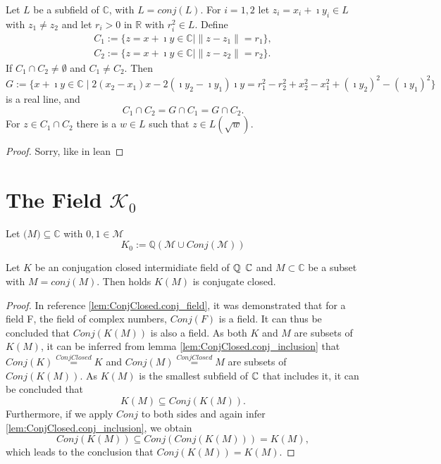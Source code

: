 \begin{lemma}
    \label{Intersection_circle_circle}
    Let $L$ be a subfield of $\mathbb{C}$, with $L = conj(L)$. For $i = 1,2 $ let $z_i = x_i + \imath y_i \in L$ with $z_1 \ne z_2$ and let $r_i > 0$ in $\mathbb{R}$ with $r_i^2 \in L$. Define
    \begin{equation*} \begin{aligned}
        C_1 := \{z = x + \imath y \in \mathbb{C} \mid \|z - z_1\| = r_1\},\\
        C_2 := \{z = x + \imath y \in \mathbb{C} \mid \|z - z_2\| = r_2\}.
    \end{aligned} \end{equation*}
    If $C_1 \cap C_2 \ne \emptyset$ and $C_1 \ne C_2$. Then 
    $$G := \{x+\imath y \in \mathbb{C} \mid 2(x_2 - x_1)x - 2(\imath y_2 - \imath y_1)\imath y = r_1^2 - r_2^2 + x_2^2 - x_1^2 + (\imath y_2)^2 - (\imath y_1)^2\} $$
    is a real line, and $$ C_1 \cap C_2 = G \cap C_1 = G \cap C_2. $$
    For $z \in C_1 \cap C_2$ there is a $w \in L$ such that $z \in L(\sqrt{w})$.
\end{lemma}
\begin{proof}
    Sorry,  like in lean %
\end{proof}

\section[K zero]{The Field $\mathcal{K}_0$}
\begin{definition}
    \label{def:K_M_0}
    Let $\mathcal(M)\subseteq\mathbb{C}$ with $0,1 \in \mathcal{M}$
    \begin{equation*}
        K_0 := \mathbb{Q}(\mathcal{M}\cup Conj(\mathcal{M}))
    \end{equation*}
\end{definition}

\begin{lemma}
    \label{lem:conj_adjion}
    \leanok
    Let $K$ be an conjugation closed intermidiate field of $\mathbb{Q}$ $\mathbb{C}$ and $ M \subset \mathbb{C}$ be a subset with $M = conj(M)$. Then holds
    $K(M)$ is conjugate closed.
\end{lemma}
\begin{proof}
    In reference \ref{lem:ConjClosed.conj_field}, it was demonstrated that for a field F, the field of complex numbers, $Conj(F)$ is a field. 
    It can thus be concluded that $Conj(K(M))$ is also a field.
    As both $K$ and $M$ are subsets of $K(M)$, it can be inferred from lemma \ref{lem:ConjClosed.conj_inclusion} that $Conj(K) \overset{ConjClosed}{=} K$ and $Conj(M) \overset{ConjClosed}{=} M$ are subsets of $Conj(K(M))$. 
    As $K(M)$ is the smallest subfield of $\mathbb{C}$ that includes it, it can be concluded that $$K(M) \subseteq Conj(K(M)).$$
    Furthermore, if we apply $Conj$ to both sides and again infer \ref{lem:ConjClosed.conj_inclusion}, we obtain $$Conj(K(M)) \subseteq Conj(Conj(K(M))) = K(M),$$ 
    which leads to the conclusion that $Conj(K(M)) = K(M)$.
\end{proof}

